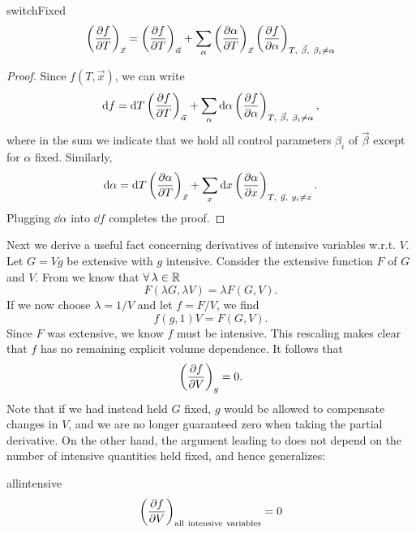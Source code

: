 \begin{proposition}{}{switchFixed}
\begin{equation*}
\left( \pdv{f}{T} \right)_{\vec{x}} =  \left(\pdv{f}{T}\right)_{\vec\alpha}
+\sum_\alpha 
\left(\pdv{\alpha}{T}\right)_{\vec{x}}
\left(\pdv{f}{\alpha}\right)_{T,~\vec{\beta},~\beta_i\neq\alpha} 
\end{equation*}
\begin{proof}
Since $f(T,\vec{x})$, we can write
\begin{equation*}
\dd f=\dd{T} \left( \pdv{f}{T} \right)_{\vec{\alpha}} 
+ \sum_\alpha\dd\alpha\left(\pdv{f}{\alpha}\right)_{T,~\vec{\beta},~\beta_i\neq\alpha},
\end{equation*}
where in the sum we indicate that we hold all control parameters $\beta_i$ of
$\vec{\beta}$ except for $\alpha$ fixed. Similarly,
\begin{equation*}
\dd\alpha=\dd{T} \left( \pdv{\alpha}{T} \right)_{\vec{x}} 
+ \sum_x\dd x\left(\pdv{\alpha}{x}\right)_{T,~\vec{y},~y_i\neq x}.
\end{equation*}
Plugging $\dd \alpha$ into $\dd f$ completes the proof.
\end{proof}
\end{proposition}

Next we derive a useful fact concerning derivatives of intensive variables
w.r.t. $V$. Let $G=Vg$ be extensive with $g$ intensive.
Consider the extensive function $F$ of $G$ and $V$. 
From  we know that $\operatorname{\forall}\lambda\in\mathbb{R}$
\begin{equation}
F(\lambda G,\lambda V)=\lambda F(G,V).
\end{equation}
If we now choose $\lambda = 1/V$ and let $f=F/V$, we find
\begin{equation}\label{eq:fintensive}
f(g,1) V=F(G,V).
\end{equation}
Since $F$ was extensive, we know $f$ must be intensive. This 
rescaling makes clear that $f$ has no remaining explicit volume dependence.
It follows that
\begin{equation}\label{eq:dfdVintensive}
\left(\pdv{f}{V}\right)_{g}=0.
\end{equation}
Note that if we had instead held $G$ fixed, $g$ would be allowed to compensate
changes in $V$, and we are no longer guaranteed zero when taking the partial
derivative. On the other hand, the argument leading to
 does not depend on the number of 
intensive quantities held fixed, and hence generalizes: 
\begin{proposition}{}{allintensive}
$$
\left(\pdv{f}{V}\right)_{{\rm all~intensive~variables}}=0
$$
\end{proposition}



